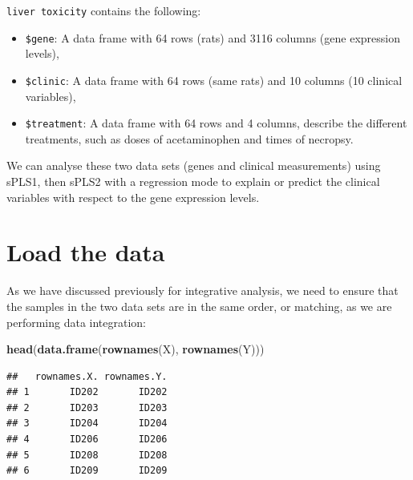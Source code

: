 \documentclass[]{book}
\newenvironment{Shaded}{\begin{snugshade}}{\end{snugshade}}
\newcommand{\KeywordTok}[1]{\textcolor[rgb]{0.13,0.29,0.53}{\textbf{#1}}}
\newcommand{\StringTok}[1]{\textcolor[rgb]{0.31,0.60,0.02}{#1}}
\newcommand{\OperatorTok}[1]{\textcolor[rgb]{0.81,0.36,0.00}{\textbf{#1}}}
\newcommand{\NormalTok}[1]{#1}
\providecommand{\tightlist}{%
  \setlength{\itemsep}{0pt}\setlength{\parskip}{0pt}}
\begin{document}
\texttt{liver\ toxicity} contains the following:

\begin{itemize}
\tightlist
\item
  \texttt{\$gene}: A data frame with 64 rows (rats) and 3116 columns
  (gene expression levels),
\item
  \texttt{\$clinic}: A data frame with 64 rows (same rats) and 10
  columns (10 clinical variables),
\item
  \texttt{\$treatment}: A data frame with 64 rows and 4 columns,
  describe the different treatments, such as doses of acetaminophen and
  times of necropsy.
\end{itemize}

We can analyse these two data sets (genes and clinical measurements)
using sPLS1, then sPLS2 with a regression mode to explain or predict the
clinical variables with respect to the gene expression levels.

\section{Load the data}\label{pls:load}

\begin{Shaded}
\end{Shaded}

As we have discussed previously for integrative analysis, we need to
ensure that the samples in the two data sets are in the same order, or
matching, as we are performing data integration:

\begin{Shaded}
\begin{Highlighting}[]
\KeywordTok{head}\NormalTok{(}\KeywordTok{data.frame}\NormalTok{(}\KeywordTok{rownames}\NormalTok{(X), }\KeywordTok{rownames}\NormalTok{(Y)))}
\end{Highlighting}
\end{Shaded}

\begin{verbatim}
##   rownames.X. rownames.Y.
## 1       ID202       ID202
## 2       ID203       ID203
## 3       ID204       ID204
## 4       ID206       ID206
## 5       ID208       ID208
## 6       ID209       ID209
\end{verbatim}
\end{document}
